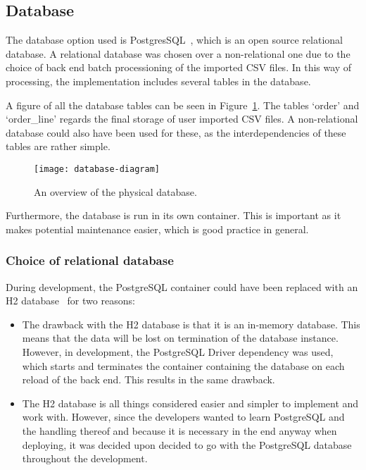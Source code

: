\subsection{Database}\label{subsec:database}

The database option used is PostgresSQL~\cite{postgresql2024}, which is an open source relational database.
A relational database was chosen over a non-relational one due to the choice of back end batch processioning of the
imported CSV files.
In this way of processing, the implementation includes several tables in the database.

A figure of all the database tables can be seen in Figure~\ref{fig:database-diagram}.
The tables `order' and `order\_line' regards the final storage of user imported CSV files.
A non-relational database could also have been used for these, as the interdependencies of these tables are rather
simple.

\begin{figure}[H]
    \centering
    \texttt{[image: database-diagram]}
    \caption{An overview of the physical database.
    }\label{fig:database-diagram}
\end{figure}

Furthermore, the database is run in its own container.
This is important as it makes potential maintenance easier, which is good practice in general.

\subsubsection{Choice of relational database}\label{subsubsec:choice-of-relational-database}

During development, the PostgreSQL container could have been replaced with
an H2
database~\cite{h22024} for two reasons:

\begin{itemize}
    \item The drawback with the
    H2
    database is that it is an in-memory database.
    This means that the data will be lost on termination of the database instance.
    However, in development, the PostgreSQL Driver dependency was used, which starts and terminates the container
    containing the database on each reload of the back end.
    This results in the same drawback.
    \item The
    H2
    database is all things considered easier and simpler to implement and work with.
    However, since the developers wanted to learn PostgreSQL and the handling thereof and because it is necessary in the
    end anyway when deploying, it was decided upon decided to go with the PostgreSQL database throughout the
    development.
\end{itemize}
